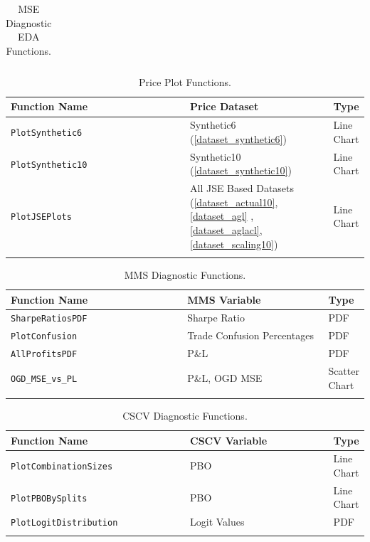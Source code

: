 \documentclass[a4paper,11pt,oneside]{article}
\theoremstyle{plain}
\theoremstyle{definition}
\begin{document}
\begin{longtable}{|p{0.5\linewidth}|p{0.4\linewidth}|p{0.1\linewidth}|}
		\caption{MSE Diagnostic EDA Functions.}
		\label{tab_diagnostics_mse}
	\end{longtable}
	
	\begin{longtable}{|p{0.5\linewidth}|p{0.4\linewidth}|p{0.1\linewidth}|}
		\hline
		\rowcolor{beaublue}
		\textbf{Function Name} &\textbf{Price Dataset}&\textbf{Type}  \\\hline	
		\texttt{PlotSynthetic6} & {Synthetic6 (\ref{dataset_synthetic6})}& {Line Chart} \\\hline
		\texttt{PlotSynthetic10} & {Synthetic10 (\ref{dataset_synthetic10})}& {Line Chart} \\\hline
		\texttt{PlotJSEPlots} & {All JSE Based Datasets (\ref{dataset_actual10}, \ref{dataset_agl} , \ref{dataset_aglacl}, \ref{dataset_scaling10})} & {Line Chart} \\\hline
		\caption{Price Plot Functions.}
		\label{tab_diagnostics_prices}
	\end{longtable}
	
	\begin{longtable}{|p{0.5\linewidth}|p{0.4\linewidth}|p{0.1\linewidth}|}
		\hline
		\rowcolor{beaublue}
		\textbf{Function Name} &\textbf{MMS Variable}&\textbf{Type}  \\\hline	
		\texttt{SharpeRatiosPDF} & {Sharpe Ratio}& {PDF} \\\hline
		\texttt{PlotConfusion} & {Trade Confusion Percentages}& {PDF} \\\hline
		\texttt{AllProfitsPDF} & {P\&L}& {PDF} \\\hline
		\texttt{OGD\_MSE\_vs\_PL} & {P\&L, OGD MSE}& {Scatter Chart} \\\hline
		\caption{MMS Diagnostic Functions.}
		\label{tab_diagnostics_mms}
	\end{longtable}
	
	\begin{longtable}{|p{0.5\linewidth}|p{0.4\linewidth}|p{0.1\linewidth}|}
		\hline
		\rowcolor{beaublue}
		\textbf{Function Name} &\textbf{CSCV Variable}&\textbf{Type}  \\\hline	
		\texttt{PlotCombinationSizes} & {PBO}& {Line Chart} \\\hline
		\texttt{PlotPBOBySplits} & {PBO}& {Line Chart} \\\hline
		\texttt{PlotLogitDistribution} & {Logit Values}& {PDF} \\\hline
		\caption{CSCV Diagnostic Functions.}
		\label{tab_diagnostics_cscv}
	\end{longtable}
\end{document}
